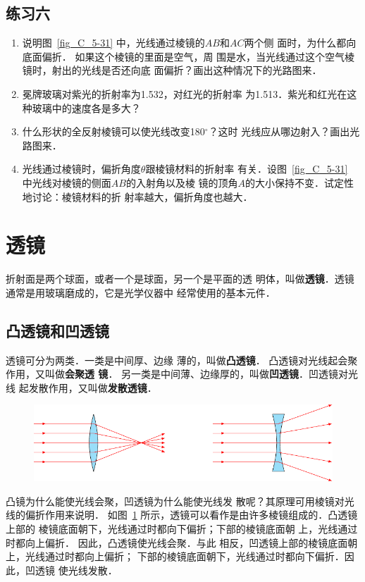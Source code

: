 \subsection*{练习六}
\begin{enumerate}
    \item 说明图~\ref{fig_C_5-31} 中，光线通过棱镜的$AB$和$AC$两个侧
面时，为什么都向底面偏折．
如果这个棱镜的里面是空气，周
围是水，当光线通过这个空气棱镜时，射出的光线是否还向底
面偏折？画出这种情况下的光路图来．
\item 冕牌玻璃对紫光的折射率为1.532，对红光的折射率
为1.513．紫光和红光在这种玻璃中的速度各是多大？
\item 什么形状的全反射棱镜可以使光线改变180$^\circ$？这时
光线应从哪边射入？画出光路图来．
\item 光线通过棱镜时，偏折角度$\theta$跟棱镜材料的折射率
有关．设图~\ref{fig_C_5-31} 中光线对棱镜的侧面$AB$的入射角以及棱
镜的顶角$A$的大小保持不变．试定性地讨论：棱镜材料的折
射率越大，偏折角度也越大．
\end{enumerate}

\section{透镜}
折射面是两个球面，或者一个是球面，另一个是平面的透
明体，叫做\textbf{透镜}．透镜通常是用玻璃磨成的，它是光学仪器中
经常使用的基本元件．

\subsection{凸透镜和凹透镜}

透镜可分为两类．一类是中间厚、边缘
薄的，叫做\textbf{凸透镜}．
凸透镜对光线起会聚作用，又叫做\textbf{会聚透
镜}．
另一类是中间薄、边缘厚的，叫做\textbf{凹透镜}．凹透镜对光线
起发散作用，又叫做\textbf{发散透镜}．
\begin{figure}[htbp]
    \centering
    \includegraphics{fig/C/5-34.pdf}
    \caption{}\label{fig_C_5-34}
\end{figure}


凸镜为什么能使光线会聚，凹透镜为什么能使光线发
散呢？其原理可用棱镜对光线的偏折作用来说明．
如图~\ref{fig_C_5-34} 所示，透镜可以看作是由许多棱镜组成的．凸透镜上部的
棱镜底面朝下，光线通过时都向下偏折；下部的棱镜底面朝
上，光线通过时都向上偏折．
因此，凸透镜使光线会聚．与此
相反，凹透镜上部的棱镜底面朝上，光线通过时都向上偏折；
下部的棱镜底面朝下，光线通过时都向下偏折．因此，凹透镜
使光线发散．

